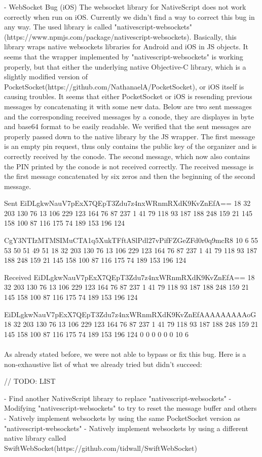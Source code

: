 - WebSocket Bug (iOS)
The websocket library for NativeScript does not work correctly when run on iOS. Currently we didn't find a way to correct this bug in any way. The used library is called "nativescript-websockets"(https://www.npmjs.com/package/nativescript-websockets). Basically, this library wraps native websockets libraries for Android and iOS in JS objects. It seems that the wrapper implemented by "nativescript-websockets" is working properly, but that either the underlying native Objective-C library, which is a slightly modified version of PocketSocket(https://github.com/NathanaelA/PocketSocket), or iOS itself is causing troubles. It seems that either PocketSocket or iOS is resending previous messages by concatenating it with some new data. Below are two sent messages and the corresponding received messages by a conode, they are displayes in byte and base64 format to be easily readable. We verified that the sent messages are properly passed down to the native library by the JS wrapper. The first message is an empty pin request, thus only contains the public key of the organizer and is correctly received by the conode. The second message, which now also contains the PIN printed by the conode is not received correctly. The received message is the first message concatenated by six zeros and then the beginning of the second message.

Sent
EiDLgkwNauV7pExX7QEpT3Zdu7z4nxWRnmRXdK9KvZnEfA==
18 32 203 130 76 13 106 229 123 164 76 87 237 1 41 79 118 93 187 188 248 159 21 145 158 100 87 116 175 74 189 153 196 124

CgY3NTIzMTMSIMuCTA1q5XukTFftASlPdl27vPifFZGeZFd0r0q9mcR8
10 6 55 53 50 51 49 51 18 32 203 130 76 13 106 229 123 164 76 87 237 1 41 79 118 93 187 188 248 159 21 145 158 100 87 116 175 74 189 153 196 124

Received
EiDLgkwNauV7pExX7QEpT3Zdu7z4nxWRnmRXdK9KvZnEfA==
18 32 203 130 76 13 106 229 123 164 76 87 237 1 41 79 118 93 187 188 248 159 21 145 158 100 87 116 175 74 189 153 196 124

EiDLgkwNauV7pExX7QEpT3Zdu7z4nxWRnmRXdK9KvZnEfAAAAAAAAAoG
18 32 203 130 76 13 106 229 123 164 76 87 237 1 41 79 118 93 187 188 248 159 21 145 158 100 87 116 175 74 189 153 196 124 0 0 0 0 0 0 10 6


\paragraph{}
As already stated before, we were not able to bypass or fix this bug. Here is a non-exhaustive list of what we already tried but didn't succeed:

// TODO: LIST

- Find another NativeScript library to replace "nativescript-websockets"
- Modifying "nativescript-websockets" to try to reset the message buffer and others
- Natively implement websockets by using the same PocketSocket version as "nativescript-websockets"
- Natively implement websockets by using a different native library called SwiftWebSocket(https://github.com/tidwall/SwiftWebSocket)
